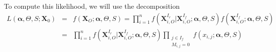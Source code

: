 \documentclass[11pt,a4paper]{report}
\begin{document}
To compute this likelihood, we will use the decomposition
\begin{eqnarray}
	L(\boldsymbol{\alpha},\Theta,S;\boldsymbol{X}_0)&=&f(\boldsymbol{X}_{O};\boldsymbol{\alpha},\Theta,S)=\prod_{i=1}^nf(\boldsymbol{X}^{I_r}_{i,O}|\boldsymbol{X}^{I_f}_{i,O};\boldsymbol{\alpha},\Theta,S)f(\boldsymbol{X}^{I_f}_{i,O};\boldsymbol{\alpha},\Theta,S) \\
	&=&\prod_{i=1}^nf(\boldsymbol{X}^{I_r}_{i,O}|\boldsymbol{X}^{I_f}_{i,O};\boldsymbol{\alpha},\Theta,S)\prod_{\substack{j \in I_f \\ M_{i,j}=0}}f(x_{i,j};\boldsymbol{\alpha},\Theta,S)
\end{eqnarray}
\end{document}
